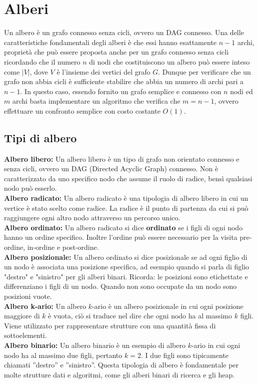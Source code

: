 \chapter{Alberi}
Un albero è un grafo connesso senza cicli, ovvero un DAG connesso. Una delle caratteristiche 
fondamentali degli alberi è che essi hanno esattamente $n-1$ archi, proprietà che può essere
proposta anche per un grafo connesso senza cicli ricordando che il numero $n$ di nodi che costituiscono 
un albero può essere inteso come $|V|$, dove $V$ è l’insieme dei vertici del grafo $G$. Dunque
per verificare che un grafo non abbia cicli è sufficiente stabilire che abbia un numero di archi
pari a $n-1$. In questo caso, essendo fornito un grafo semplice e connesso con $n$ nodi ed $m$ archi
basta implementare un algoritmo che verifica che $m = n-1$, ovvero effettuare un confronto
semplice con costo costante $O(1)$.
\section{Tipi di albero}
\textbf{Albero libero:} Un albero libero è un tipo di grafo non orientato connesso e senza cicli, 
ovvero un DAG (Directed Acyclic Graph) connesso. Non è caratterizzato da uno specifico nodo 
che assume il ruolo di radice, bensì qualsiasi nodo può esserlo.\medskip\\
\textbf{Albero radicato:} Un albero radicato è una tipologia di albero libero in cui un vertice è 
stato scelto come radice. La radice è il punto di partenza da cui si può raggiungere ogni altro nodo attraverso 
un percorso unico.\medskip\\
\textbf{Albero ordinato:} Un albero radicato si dice \textbf{ordinato} se i figli di ogni nodo hanno un ordine specifico. 
Inoltre l'ordine può essere necessario per la visita pre-ordine, in-ordine e post-ordine.\medskip\\
\textbf{Albero posizionale:} Un albero ordinato si dice posizionale se ad ogni figlio di un nodo è associata 
una posizione specifica, ad esempio quando si parla di figlio "destro" e "sinistro" per gli alberi binari. Ricorda: le posizioni sono 
etichettate e differenziano i figli di un nodo. Quando non sono occupate da un nodo sono posizioni vuote.\medskip\\
\textbf{Albero k-ario:} Un albero $k$-ario è un albero posizionale in cui ogni posizione maggiore di
$k$ è vuota, ciò si traduce nel dire che ogni nodo ha al massimo $k$ figli. Viene utilizzato per
rappresentare strutture con una quantità fissa di sottoelementi.\medskip\\
\textbf{Albero binario:} Un albero binario è un esempio di albero $k$-ario in cui ogni nodo ha al
massimo due figli, pertanto $k = 2$. I due figli sono tipicamente chiamati ”destro” e ”sinistro”.
Questa tipologia di albero è fondamentale per molte strutture dati e algoritmi, come gli alberi
binari di ricerca e gli heap.
